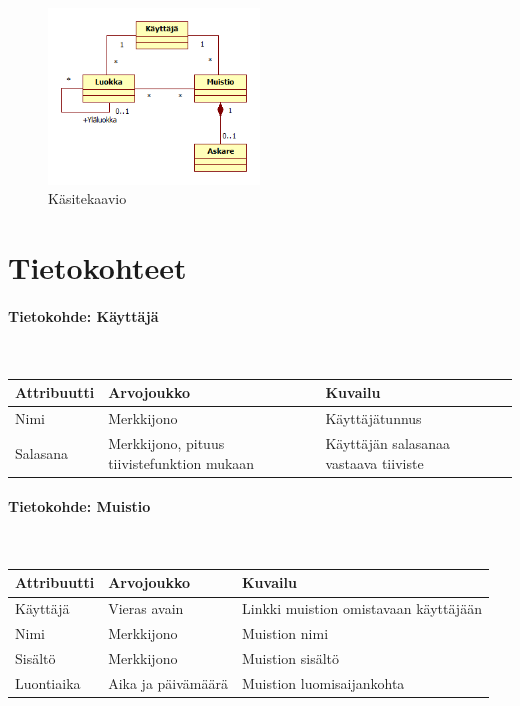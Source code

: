 ﻿\documentclass[finnish]{report}
\begin{document}
\begin{figure}[H]
\centering
\includegraphics[width=0.5\textwidth]{kasitekaavio}
\caption{Käsitekaavio}
\end{figure}

\section{Tietokohteet}

\paragraph{Tietokohde: Käyttäjä} ~\\

\begin{tabular}{ | l | l | l | }
  \hline
  Attribuutti & Arvojoukko & Kuvailu \\ \hline
  Nimi & Merkkijono & Käyttäjätunnus \\
  Salasana & Merkkijono, pituus tiivistefunktion mukaan & Käyttäjän salasanaa vastaava tiiviste \\
  \hline
\end{tabular}


\paragraph{Tietokohde: Muistio} ~\\

\begin{tabular}{ | l | l | l | }
  \hline
  Attribuutti & Arvojoukko & Kuvailu \\ \hline
  Käyttäjä & Vieras avain & Linkki muistion omistavaan käyttäjään \\
  Nimi & Merkkijono & Muistion nimi \\
  Sisältö & Merkkijono & Muistion sisältö \\
  Luontiaika & Aika ja päivämäärä & Muistion luomisaijankohta \\
  \hline
\end{tabular}
\end{document}
